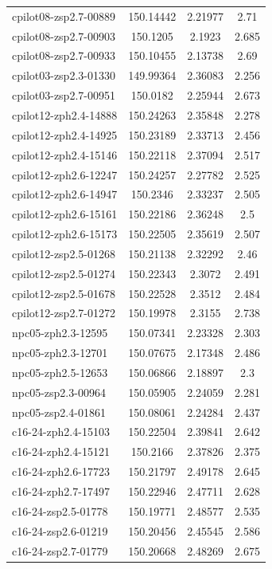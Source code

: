 \documentclass[twocolumn,tight,times]{aastex63}
\begin{document}
\begin{center}
\begin{longtable}{l|c|c|c}
cpilot08-zsp2.7-00889 & 150.14442 & 2.21977 & 2.71 \\
cpilot08-zsp2.7-00903 & 150.1205 & 2.1923 & 2.685 \\
cpilot08-zsp2.7-00933 & 150.10455 & 2.13738 & 2.69 \\
cpilot03-zsp2.3-01330 & 149.99364 & 2.36083 & 2.256 \\
cpilot03-zsp2.7-00951 & 150.0182 & 2.25944 & 2.673 \\
cpilot12-zph2.4-14888 & 150.24263 & 2.35848 & 2.278 \\
cpilot12-zph2.4-14925 & 150.23189 & 2.33713 & 2.456 \\
cpilot12-zph2.4-15146 & 150.22118 & 2.37094 & 2.517 \\
cpilot12-zph2.6-12247 & 150.24257 & 2.27782 & 2.525 \\
cpilot12-zph2.6-14947 & 150.2346 & 2.33237 & 2.505 \\
cpilot12-zph2.6-15161 & 150.22186 & 2.36248 & 2.5 \\
cpilot12-zph2.6-15173 & 150.22505 & 2.35619 & 2.507 \\
cpilot12-zsp2.5-01268 & 150.21138 & 2.32292 & 2.46 \\
cpilot12-zsp2.5-01274 & 150.22343 & 2.3072 & 2.491 \\
cpilot12-zsp2.5-01678 & 150.22528 & 2.3512 & 2.484 \\
cpilot12-zsp2.7-01272 & 150.19978 & 2.3155 & 2.738 \\
npc05-zph2.3-12595 & 150.07341 & 2.23328 & 2.303 \\
npc05-zph2.3-12701 & 150.07675 & 2.17348 & 2.486 \\
npc05-zph2.5-12653 & 150.06866 & 2.18897 & 2.3 \\
npc05-zsp2.3-00964 & 150.05905 & 2.24059 & 2.281 \\
npc05-zsp2.4-01861 & 150.08061 & 2.24284 & 2.437 \\
c16-24-zph2.4-15103 & 150.22504 & 2.39841 & 2.642 \\
c16-24-zph2.4-15121 & 150.2166 & 2.37826 & 2.375 \\
c16-24-zph2.6-17723 & 150.21797 & 2.49178 & 2.645 \\
c16-24-zph2.7-17497 & 150.22946 & 2.47711 & 2.628 \\
c16-24-zsp2.5-01778 & 150.19771 & 2.48577 & 2.535 \\
c16-24-zsp2.6-01219 & 150.20456 & 2.45545 & 2.586 \\
c16-24-zsp2.7-01779 & 150.20668 & 2.48269 & 2.675 \\

\end{longtable}
\end{center}
\end{document}
